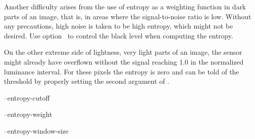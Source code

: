 Another difficulty arises from the use of entropy as a weighting function in dark parts of an
image, that is, in areas where the signal-to-noise ratio is low.  Without any precautions, high
noise is taken to be high entropy, which might not be desired.  Use
option~ to control the black level when computing the entropy.

On the other extreme side of lightness, very light parts of an image, the sensor might already
have overflown without the signal reaching 1.0 in the normalized luminance interval.  For these
pixels the entropy is zero and \App{} can be told of the threshold by properly setting the
second argument of .

\begin{optionsummary}
\item[--entropy-cutoff] \sectionName~
\item[--entropy-weight] \sectionName~
\item[--entropy-window-size] \sectionName~
\end{optionsummary}



